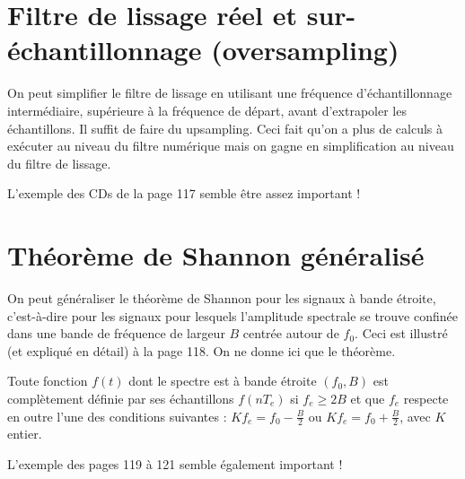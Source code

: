     \section{Filtre de lissage réel et sur-échantillonnage (oversampling)}
        On peut simplifier le filtre de lissage en utilisant une fréquence d'échantillonnage intermédiaire, supérieure à la fréquence de départ, avant d'extrapoler les échantillons. Il suffit de faire du upsampling. Ceci fait qu'on a plus de calculs à exécuter au niveau du filtre numérique mais on gagne en simplification au niveau du filtre de lissage.

        \begin{exemple}
            L'exemple des CDs de la page 117 semble être assez important !
        \end{exemple}

    \section{Théorème de Shannon généralisé}
        On peut généraliser le théorème de Shannon pour les signaux à bande étroite, c'est-à-dire pour les signaux pour lesquels l'amplitude spectrale se trouve confinée dans une bande de fréquence de largeur $B$ centrée autour de $f_0$. Ceci est illustré (et expliqué en détail) à la page 118. On ne donne ici que le théorème.

        \begin{theorem}
            Toute fonction $f(t)$ dont le spectre est à bande étroite $(f_0, B)$ est complètement définie par ses échantillons $f(nT_e)$ si $f_e\geq 2B$ et que $f_e$ respecte en outre l'une des conditions suivantes : $Kf_e = f_0 - \frac{B}{2}$ ou $Kf_e = f_0 + \frac{B}{2}$, avec $K$ entier.
        \end{theorem}

        \begin{exemple}
            L'exemple des pages 119 à 121 semble également important !
        \end{exemple}